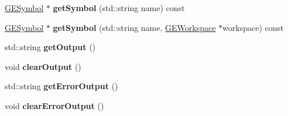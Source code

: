 \begin{DoxyCompactItemize}
\item 
\hypertarget{class_g_a_u_s_s_afca7a73a915482f93377bbf780fcd836}{\hyperlink{class_g_e_symbol}{G\-E\-Symbol} $\ast$ {\bfseries get\-Symbol} (std\-::string name) const }\label{class_g_a_u_s_s_afca7a73a915482f93377bbf780fcd836}

\item 
\hypertarget{class_g_a_u_s_s_ac6ebb1f938895313ef33b5c16ba033ea}{\hyperlink{class_g_e_symbol}{G\-E\-Symbol} $\ast$ {\bfseries get\-Symbol} (std\-::string name, \hyperlink{class_g_e_workspace}{G\-E\-Workspace} $\ast$workspace) const }\label{class_g_a_u_s_s_ac6ebb1f938895313ef33b5c16ba033ea}

\item 
\hypertarget{class_g_a_u_s_s_a4aaf36cbdd2edb0d14bd705bc1ee161e}{std\-::string {\bfseries get\-Output} ()}\label{class_g_a_u_s_s_a4aaf36cbdd2edb0d14bd705bc1ee161e}

\item 
\hypertarget{class_g_a_u_s_s_a559e0215a8d9f6d24b9258927bb24533}{void {\bfseries clear\-Output} ()}\label{class_g_a_u_s_s_a559e0215a8d9f6d24b9258927bb24533}

\item 
\hypertarget{class_g_a_u_s_s_a710dea1e26b3af12dfed9092323fecd5}{std\-::string {\bfseries get\-Error\-Output} ()}\label{class_g_a_u_s_s_a710dea1e26b3af12dfed9092323fecd5}

\item 
\hypertarget{class_g_a_u_s_s_a7de5e45505c311bb52cb2f1c8f827d58}{void {\bfseries clear\-Error\-Output} ()}\label{class_g_a_u_s_s_a7de5e45505c311bb52cb2f1c8f827d58}

\end{DoxyCompactItemize}
